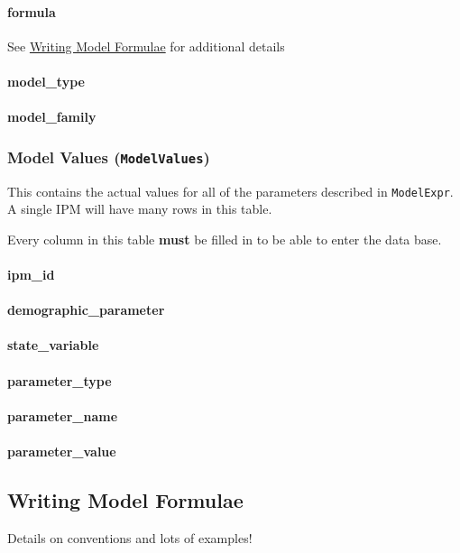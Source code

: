 \documentclass[]{article}
\let\oldparagraph\paragraph
\renewcommand{\paragraph}[1]{\oldparagraph{#1}\mbox{}}
\begin{document}
\paragraph{formula}\label{formula}

See \protect\hyperlink{model-forms}{Writing Model Formulae} for
additional details

\paragraph{model\_type}\label{model_type}

\paragraph{model\_family}\label{model_family}

\subsubsection{\texorpdfstring{Model Values
(\texttt{ModelValues})}{Model Values (ModelValues)}}\label{model-values-modelvalues}

This contains the actual values for all of the parameters described in
\texttt{ModelExpr}. A single IPM will have many rows in this table.

Every column in this table \textbf{must} be filled in to be able to
enter the data base.

\paragraph{ipm\_id}\label{ipm_id-4}

\paragraph{demographic\_parameter}\label{demographic_parameter-1}

\paragraph{state\_variable}\label{state_variable-2}

\paragraph{parameter\_type}\label{parameter_type}

\paragraph{parameter\_name}\label{parameter_name}

\paragraph{parameter\_value}\label{parameter_value}

\hypertarget{model-forms}{\subsection{Writing Model
Formulae}\label{model-forms}}

Details on conventions and lots of examples!
\end{document}
